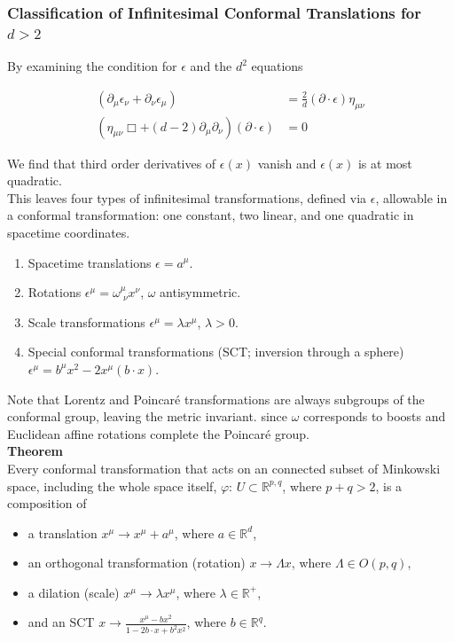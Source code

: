 \subsubsection*{Classification of Infinitesimal Conformal Translations for $d>2$}

\noindent By examining the condition for $\epsilon$ and the $d^2$ equations

\begin{align}
(\partial_\mu \epsilon_\nu + \partial_\nu \epsilon_\mu) &= \frac{2}{d} (\partial \cdot \epsilon) \eta_{\mu\nu} \\
(\eta_{\mu\nu} \Box + (d-2) \partial_\mu \partial_\nu) (\partial \cdot \epsilon) &= 0
\end{align}

\noindent We find that third order derivatives of $\epsilon(x)$ vanish and $\epsilon(x)$ is at most quadratic. \\

\noindent This leaves four types of infinitesimal transformations, defined via $\epsilon$, allowable in a conformal transformation: one constant, two linear, and one quadratic in spacetime coordinates.

\begin{enumerate}
\item Spacetime translations
	\subitem $\epsilon = a^\mu$.
\item Rotations
	\subitem  $\epsilon^\mu = \omega^\mu_{\,\,\nu} x^\nu$, $\omega$ antisymmetric.
\item Scale transformations
	\subitem $\epsilon^\mu = \lambda x^\mu$, $\lambda > 0$.
\item Special conformal transformations (SCT; inversion through a sphere)
	\subitem $\epsilon^\mu = b^\mu x^2 - 2 x^\mu (b \cdot x)$.
\end{enumerate}

\noindent Note that Lorentz and Poincar\'e transformations are always subgroups of the conformal group, leaving the metric invariant. since $\omega$ corresponds to boosts and Euclidean affine rotations complete the Poincar\'e group. \\

\noindent \textbf{Theorem} \\

\noindent Every conformal transformation that acts on an connected subset of Minkowski space, including the whole space itself, $\varphi : \, U \subset \mathbb{R}^{p,q}$, where $p+q > 2$, is a composition of 

\begin{itemize}
\item a translation
	\subitem $x^\mu \rightarrow x^\mu + a^\mu$, where $a \in \mathbb{R}^d$,
\item an orthogonal transformation (rotation)
	\subitem $x \rightarrow \Lambda x$, where $\Lambda \in O(p,q)$,
\item a dilation (scale)
	\subitem $x^\mu \rightarrow \lambda x^\mu$, where $\lambda \in \mathbb{R}^+$,
\item and an SCT
	\subitem $x \rightarrow \frac{x^\mu - b x^2 }{1-2b \cdot x + b^2 x^2}$, where $b \in \mathbb{R}^q$.
\end{itemize}

